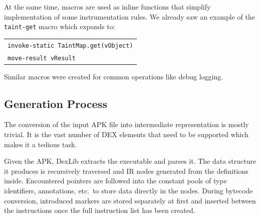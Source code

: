 \documentclass[12pt,twoside,notitlepage]{report}
\newcommand{\centerbox}[1] {
	\begin{center}
	\begin{footnotesize}
	\begin{tabular}{l}
		#1
	\end{tabular}
	\end{footnotesize}
	\end{center}
}
\newcommand{\asm}[1] {\texttt{#1}}
\begin{document}
At the same time, macros are used as inline functions that simplify implementation of some instrumentation rules. We already saw an example of the \verb$taint-get$ macro which expands to:
	\centerbox{
		\asm{invoke-static TaintMap.get(vObject)} \\
		\asm{move-result vResult}
	}
Similar macros were created for common operations like debug logging.

\subsection{Generation Process}

The conversion of the input APK file into intermediate representation is mostly trivial. It is the vast number of DEX elements that need to be supported which makes it a tedious task. 

Given the APK, DexLib extracts the executable and parses it. The data structure it produces is recursively traversed and IR nodes generated from the definitions inside. Encountered pointers are followed into the constant pools of type identifiers, annotations, etc.\ to store data directly in the nodes. During bytecode conversion, introduced markers are stored separately at first and inserted between the instructions once the full instruction list has been created.



\end{document}
